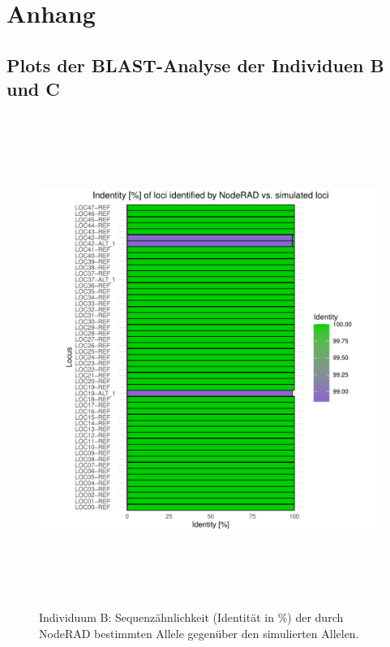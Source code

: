 \chapter{Anhang}
\section{Plots der BLAST-Analyse der Individuen B und C} \label{append_plots}

\begin{figure}[H]
	\begin{center}
		\includegraphics[height=16cm]{bilder/evaluation/perc_ident/B.plot_loci.pdf}
		\caption{Individuum B: Sequenzähnlichkeit (Identität in $ \% $) der durch NodeRAD bestimmten Allele gegenüber den simulierten Allelen.}
	\end{center}
\end{figure}

